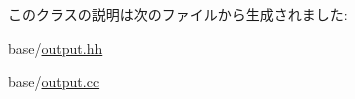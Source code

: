 このクラスの説明は次のファイルから生成されました:\begin{DoxyCompactItemize}
\item 
base/\hyperlink{output_8hh}{output.hh}\item 
base/\hyperlink{output_8cc}{output.cc}\end{DoxyCompactItemize}
